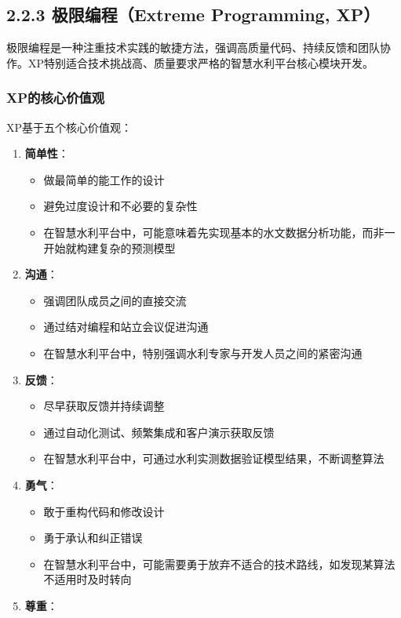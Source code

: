 \subsection{2.2.3 极限编程（Extreme Programming,
XP）}\label{ux6781ux9650ux7f16ux7a0bextreme-programming-xp}

极限编程是一种注重技术实践的敏捷方法，强调高质量代码、持续反馈和团队协作。XP特别适合技术挑战高、质量要求严格的智慧水利平台核心模块开发。

\subsubsection{XP的核心价值观}\label{xpux7684ux6838ux5fc3ux4ef7ux503cux89c2}

XP基于五个核心价值观：

\begin{enumerate}
\def\labelenumi{\arabic{enumi}.}
\tightlist
\item
  \textbf{简单性}：

  \begin{itemize}
  \tightlist
  \item
    做最简单的能工作的设计
  \item
    避免过度设计和不必要的复杂性
  \item
    在智慧水利平台中，可能意味着先实现基本的水文数据分析功能，而非一开始就构建复杂的预测模型
  \end{itemize}
\item
  \textbf{沟通}：

  \begin{itemize}
  \tightlist
  \item
    强调团队成员之间的直接交流
  \item
    通过结对编程和站立会议促进沟通
  \item
    在智慧水利平台中，特别强调水利专家与开发人员之间的紧密沟通
  \end{itemize}
\item
  \textbf{反馈}：

  \begin{itemize}
  \tightlist
  \item
    尽早获取反馈并持续调整
  \item
    通过自动化测试、频繁集成和客户演示获取反馈
  \item
    在智慧水利平台中，可通过水利实测数据验证模型结果，不断调整算法
  \end{itemize}
\item
  \textbf{勇气}：

  \begin{itemize}
  \tightlist
  \item
    敢于重构代码和修改设计
  \item
    勇于承认和纠正错误
  \item
    在智慧水利平台中，可能需要勇于放弃不适合的技术路线，如发现某算法不适用时及时转向
  \end{itemize}
\item
  \textbf{尊重}：


\end{enumerate}
